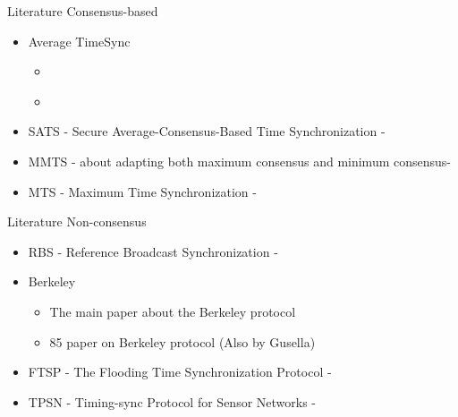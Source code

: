 \documentclass{beamer}
\begin{document}
\begin{frame}{Literature}
    Consensus-based
    
        \begin{itemize}
            \item Average TimeSync
                \begin{itemize}                        
                \item \cite{SchenatoGamba07}
                    \item \cite{LucaFiorentin11}
                \end{itemize}
            \item SATS - Secure Average-Consensus-Based Time Synchronization - \cite{HeChengShiChen13}
            \item MMTS - about adapting both maximum consensus and minimum consensus- \cite{HeLiChenCheng13}
            \item MTS - Maximum Time Synchronization - \cite{HeChengShiChen14}
        \end{itemize}
\end{frame}

\begin{frame}{Literature}
    Non-consensus
    
        \begin{itemize}
        \item  RBS - Reference Broadcast Synchronization - \cite{ElsonGirodEstrin02}
        \item Berkeley
          \begin{itemize}
          \item \cite{Gusella89} The main paper about the Berkeley protocol
          \item \cite{GusellaZatti85} 85 paper on Berkeley protocol (Also by Gusella)
          \end{itemize}
        \item FTSP - The Flooding Time Synchronization Protocol - \cite{Maroti04} 
        \item TPSN - Timing-sync Protocol for Sensor Networks - \cite{GaneriwalKumarSrivastava03}
    \end{itemize}

\end{frame}
 
\end{document}

